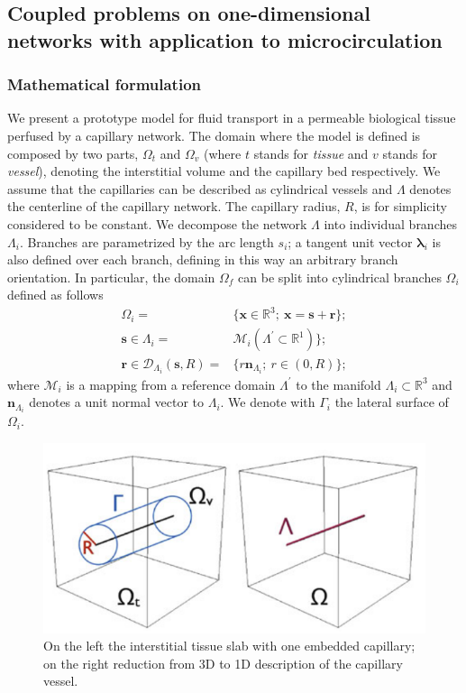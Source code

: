 \documentclass[10pt]{article} %
\def\R{\mathbb{R}}
\def\xx{\boldsymbol x}
\def\rr{\boldsymbol r}
\def\ss{\boldsymbol s}
\def\nn{\boldsymbol n}
\begin{document}
	\subsection{Coupled problems on one-dimensional networks with application to microcirculation}
	
	\subsubsection{Mathematical formulation}
	We present a prototype model for fluid transport in a permeable biological tissue perfused by a capillary network. 
	The domain where the model is defined is composed by two parts, $\Omega_t$ and $\Omega_v$ (where $t$ stands for \textit{tissue} and $v$ stands for \textit{vessel}), denoting the interstitial volume and the capillary bed respectively.
	We assume that the capillaries can be described as cylindrical vessels and  $\Lambda$ denotes the centerline of the capillary network. The capillary radius, $R$, is for simplicity considered to be constant.  We decompose the network $\Lambda$ into individual branches $\Lambda_i$. Branches are parametrized by the arc length $s_i$; a tangent unit vector $\boldsymbol \lambda_i$ is also defined over each branch, defining in this way an arbitrary branch orientation. In particular, the domain $\Omega_f$ can be split into cylindrical branches $\Omega_i$ defined as follows
	\begin{align*}
	\Omega_i = & \{ \xx \in \R^3; \ \xx = \ss + \rr\}; \\
	\ss \in \Lambda_i = & \mathcal{M}_i(\Lambda^\prime \subset \R^1)\}; \\
	\rr \in \mathcal{D}_{\Lambda_i}(\ss,R) = & \{ r \nn_{\Lambda_i}; \ r\in(0,R)\};
	\end{align*}
	where $\mathcal{M}_i$ is a mapping from a reference domain $\Lambda^\prime$ to the manifold $\Lambda_i \subset \R^3$ and $\nn_{\Lambda_i}$ denotes a unit normal vector to $\Lambda_i$. We denote with $\Gamma_i$ the lateral surface of $\Omega_i$. 
	
	\begin{figure}
		\centering
		\includegraphics[width=0.7\linewidth]{"3d-1d domain"}
		\caption[Fig. 1]{On the left the interstitial tissue slab with one embedded capillary; on the right reduction from 3D to 1D description of the capillary vessel.}
		\label{fig:3d-1d-domain}
	\end{figure}	
	
\end{document}
